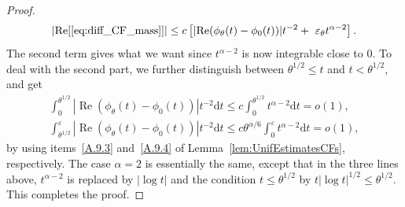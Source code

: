 \documentclass[11pt]{article}
\theoremstyle{definition}
\numberwithin{equation}{section}
\numberwithin{figure}{section}
\numberwithin{table}{section}
\DeclareMathOperator{\re}{Re}
\newcommand{\ga}{\alpha}
\newcommand{\gep}{\varepsilon}
\newcommand{\gt}{\theta}
\newcommand{\dd}{\mathrm{d}}
\begin{document}
\begin{proof}
\begin{equation}
\mathopen{|}\re[\eqref{eq:diff_CF_mass}]| \le c
\left[
\mathopen{|} \re(\phi_\gt(t) - \phi_0(t))| t^{-2} +\
\gep_\gt t^{\ga - 2}\right].
\end{equation} The second term gives what we want since $t^{\ga-2}$ is now integrable close to $0$. To deal with the second part, we further distinguish between $\gt^{1/2} \le t$ and $t < \gt^{1/2}$, and get
\begin{gather}
\int_0^{\theta^{1/2}} |{\re(\phi_\gt(t) - \phi_0(t))}| t^{-2} \dd t \le c \int_0^{\theta^{1/2}} t^{\ga-2} \dd t= o(1),
\\
\int_{\theta^{1/2}}^\gep |{\re(\phi_\gt(t) - \phi_0(t))}| t^{-2} \dd t \le c \gt^{\ga/6} \int_0^{\gep} t^{\ga-2} \dd t = o(1),
\end{gather}
by using items~\eqref{A.9.3} and~\eqref{A.9.4} of Lemma~\ref{lem:UnifEstimatesCFs}, respectively. The case $\ga = 2$ is essentially the same, except that in the three lines above, $t^{\ga-2}$ is replaced by $|\log t|$ and the condition $t\le \gt^{1/2}$ by $t|\log t|^{1/2}\le \gt^{1/2}$. This completes the proof.
\end{proof}
\end{document}
